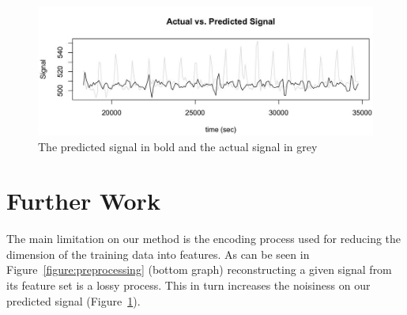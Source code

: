\documentclass[12pt]{article}
\begin{document}
 \begin{figure}
\captionsetup{justification=raggedright}
\includegraphics[width=\textwidth]{images/actual_vs_pred_signal.jpg}
\caption{The predicted signal in bold and the actual signal in grey \label{figure:pred}}
\end{figure}

 \section{Further Work}
The main limitation on our method is the encoding process used for reducing the dimension of the training data into features. As can be seen in Figure~\ref{figure:preprocessing} (bottom graph) reconstructing a given signal from its feature set is a lossy process. This in turn increases the noisiness on our predicted signal (Figure~\ref{figure:pred}).



  
\end{document}
